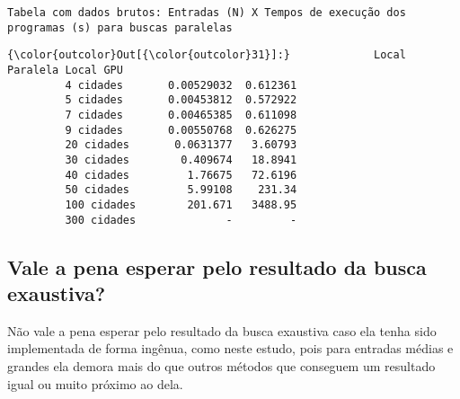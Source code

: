 \documentclass[11pt]{article}
\begin{document}
    \begin{Verbatim}[commandchars=\\\{\}]
Tabela com dados brutos: Entradas (N) X Tempos de execução dos programas (s) para buscas paralelas

    \end{Verbatim}

\begin{Verbatim}[commandchars=\\\{\}]
{\color{outcolor}Out[{\color{outcolor}31}]:}             Local Paralela Local GPU
         4 cidades       0.00529032  0.612361
         5 cidades       0.00453812  0.572922
         7 cidades       0.00465385  0.611098
         9 cidades       0.00550768  0.626275
         20 cidades       0.0631377   3.60793
         30 cidades        0.409674   18.8941
         40 cidades         1.76675   72.6196
         50 cidades         5.99108    231.34
         100 cidades        201.671   3488.95
         300 cidades              -         -
\end{Verbatim}
            
    \subsection{Vale a pena esperar pelo resultado da busca
exaustiva?}\label{vale-a-pena-esperar-pelo-resultado-da-busca-exaustiva}

    Não vale a pena esperar pelo resultado da busca exaustiva caso ela tenha
sido implementada de forma ingênua, como neste estudo, pois para
entradas médias e grandes ela demora mais do que outros métodos que
conseguem um resultado igual ou muito próximo ao dela.
\end{document}
